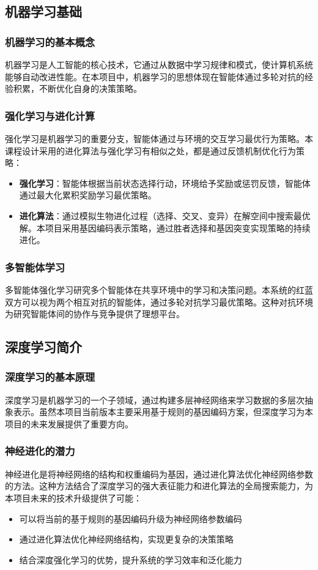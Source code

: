 \documentclass[12pt,a4paper]{article}
\begin{document}
	\subsection{机器学习基础}
	\subsubsection{机器学习的基本概念}
	机器学习是人工智能的核心技术，它通过从数据中学习规律和模式，使计算机系统能够自动改进性能。在本项目中，机器学习的思想体现在智能体通过多轮对抗的经验积累，不断优化自身的决策策略。
	
	\subsubsection{强化学习与进化计算}
	强化学习是机器学习的重要分支，智能体通过与环境的交互学习最优行为策略。本课程设计采用的进化算法与强化学习有相似之处，都是通过反馈机制优化行为策略：
	\begin{itemize}
		\item \textbf{强化学习}：智能体根据当前状态选择行动，环境给予奖励或惩罚反馈，智能体通过最大化累积奖励学习最优策略。
		
		\item \textbf{进化算法}：通过模拟生物进化过程（选择、交叉、变异）在解空间中搜索最优解。本项目采用基因编码表示策略，通过胜者选择和基因突变实现策略的持续进化。
	\end{itemize}
	
	\subsubsection{多智能体学习}
	多智能体强化学习研究多个智能体在共享环境中的学习和决策问题。本系统的红蓝双方可以视为两个相互对抗的智能体，通过多轮对抗学习最优策略。这种对抗环境为研究智能体间的协作与竞争提供了理想平台。
	
	\subsection{深度学习简介}
	\subsubsection{深度学习的基本原理}
	深度学习是机器学习的一个子领域，通过构建多层神经网络来学习数据的多层次抽象表示。虽然本项目当前版本主要采用基于规则的基因编码方案，但深度学习为本项目的未来发展提供了重要方向。
	
	\subsubsection{神经进化的潜力}
	神经进化是将神经网络的结构和权重编码为基因，通过进化算法优化神经网络参数的方法。这种方法结合了深度学习的强大表征能力和进化算法的全局搜索能力，为本项目未来的技术升级提供了可能：
	\begin{itemize}
		\item 可以将当前的基于规则的基因编码升级为神经网络参数编码
		\item 通过进化算法优化神经网络结构，实现更复杂的决策策略
		\item 结合深度强化学习的优势，提升系统的学习效率和泛化能力
	\end{itemize}
	
\end{document}
